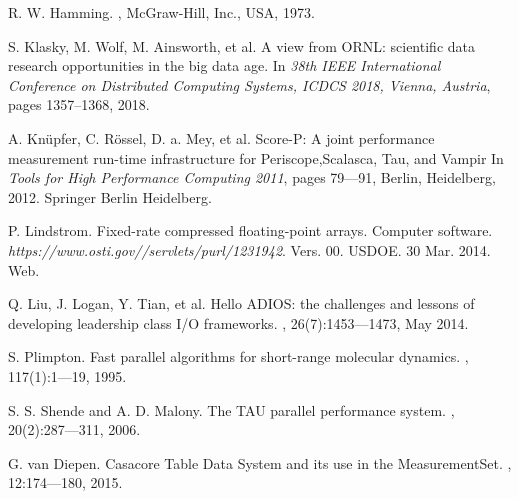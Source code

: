 \begin{thebibliography}{10}
 R. W. Hamming. , McGraw-Hill, Inc., USA, 1973.

 S. Klasky, M. Wolf, M. Ainsworth, et al.
\newblock A view from ORNL: scientific data research opportunities in the big data age. \newblock In {\em 38th IEEE International Conference on Distributed
Computing Systems, ICDCS 2018, Vienna, Austria}, pages 1357–1368, 2018.

 A. Kn{\"u}pfer, C. R{\"o}ssel, D. a. Mey, et al.
\newblock Score-P: A
joint performance measurement run-time infrastructure for Periscope,Scalasca, Tau, and Vampir \newblock In {\em Tools for High Performance Computing 2011}, pages 79---91, Berlin, Heidelberg, 2012. Springer
Berlin Heidelberg.

 P. Lindstrom. \newblock Fixed-rate compressed floating-point arrays. Computer software. {\em https://www.osti.gov//servlets/purl/1231942}. Vers. 00. USDOE. 30 Mar. 2014. Web.

 Q. Liu,  J. Logan,  Y. Tian,  et al.
\newblock Hello ADIOS: the challenges and lessons of developing
leadership class I/O frameworks. , 26(7):1453---1473, May 2014.

 S. Plimpton.  \newblock Fast parallel algorithms for short-range molecular dynamics. , 117(1):1---19, 1995.

 S. S. Shende and A. D. Malony. \newblock The TAU parallel performance system. , 20(2):287---311, 2006.

 G. van Diepen.  \newblock Casacore Table Data System and its use in the MeasurementSet. , 12:174---180, 2015.


\end{thebibliography}
